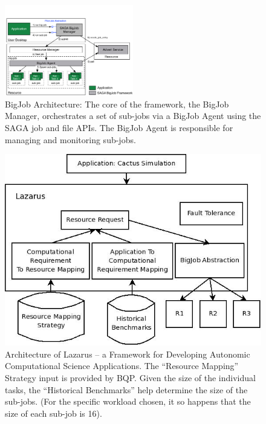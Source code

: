 \documentclass{acm_proc_article-sp}
\newcommand{\up}{\vspace*{-0.3em}}
\newcommand{\jhanote}[1]{ {\textcolor{red} { ***Jha: #1 }}}
\newcommand{\jhanote}[1]{}
\begin{document}
\begin{figure}[ht]
    \centering
    \includegraphics[width=0.5\textwidth]{./bigjob.pdf}
   \caption{BigJob Architecture: The core of the framework, the
      BigJob Manager, orchestrates a set of sub-jobs via a
      BigJob Agent using the SAGA job and file APIs.  The
      BigJob Agent is responsible for managing and monitoring sub-jobs.\up}
   \label{fig:bigjob}
\end{figure}


\begin{figure}
\centering
\includegraphics[scale=0.4]{Lazarus_01.jpeg}

\caption{Architecture of Lazarus -- a Framework for Developing
  Autonomic Computational Science Applications. The ``Resource
  Mapping'' Strategy input is provided by BQP. Given the size of the
  individual tasks, the ``Historical Benchmarks'' help determine the
  size of the sub-jobs. (For the specific workload chosen, it so
  happens that the size of each sub-job is 16).}
\label{fig:application_architecture}

\end{figure}
\end{document}
